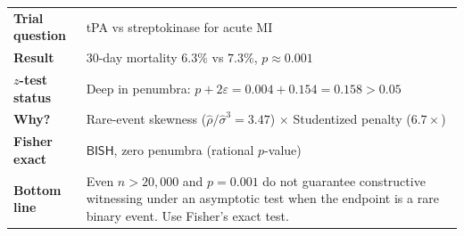 \documentclass[11pt,a4paper]{article}
\theoremstyle{plain}
\theoremstyle{definition}
\newcommand{\BISH}{\textsf{BISH}}
\begin{document}
\begin{tcolorbox}[
  colback=yellow!3,
  colframe=yellow!50!black,
  fonttitle=\bfseries,
  title={Summary: GUSTO-I},
  arc=3pt, boxrule=0.6pt
]
\small
\begin{tabular}{@{}p{3.5cm}p{9cm}@{}}
\textbf{Trial question} & tPA vs streptokinase for acute MI \\
\textbf{Result} & 30-day mortality $6.3\%$ vs $7.3\%$, $p \approx 0.001$ \\
\textbf{$z$-test status} & Deep in penumbra: $p + 2\varepsilon = 0.004 + 0.154 = 0.158 > 0.05$ \\
\textbf{Why?} & Rare-event skewness ($\hat\rho/\hat\sigma^3 = 3.47$) $\times$ Studentized penalty ($6.7\times$) \\
\textbf{Fisher exact} & $\BISH$, zero penumbra (rational $p$-value) \\
\textbf{Bottom line} & Even $n > 20{,}000$ and $p = 0.001$ do not guarantee constructive witnessing under an asymptotic test when the endpoint is a rare binary event.  Use Fisher's exact test.
\end{tabular}
\end{tcolorbox}
\end{document}

